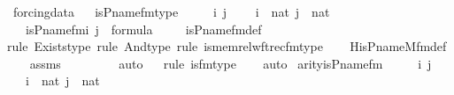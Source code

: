 \begin{isabellebody}
\isanewline
{}\isamarkupfalse%
\ forcing{\isacharunderscore}{\kern0pt}data\isanewline
{}\ \isanewline
\isanewline
{}\isamarkupfalse%
\ is{\isacharunderscore}{\kern0pt}P{\isacharunderscore}{\kern0pt}name{\isacharunderscore}{\kern0pt}fm{\isacharunderscore}{\kern0pt}type\ {\isacharcolon}{\kern0pt}\ \isanewline
\ \ \ i\ j\ \isanewline
\ \ \ {\isachardoublequoteopen}i\ {\isasymin}\ nat{\isachardoublequoteclose}\ {\isachardoublequoteopen}j\ {\isasymin}\ nat{\isachardoublequoteclose}\ \isanewline
\ \ \ {\isachardoublequoteopen}is{\isacharunderscore}{\kern0pt}P{\isacharunderscore}{\kern0pt}name{\isacharunderscore}{\kern0pt}fm{\isacharparenleft}{\kern0pt}i{\isacharcomma}{\kern0pt}\ j{\isacharparenright}{\kern0pt}\ {\isasymin}\ formula{\isachardoublequoteclose}\ \isanewline
%
\isadelimproof
\ \ %
\endisadelimproof
%
\isatagproof
{}\isamarkupfalse%
\ is{\isacharunderscore}{\kern0pt}P{\isacharunderscore}{\kern0pt}name{\isacharunderscore}{\kern0pt}fm{\isacharunderscore}{\kern0pt}def\ \isanewline
\ \ \isamarkupfalse%
{\isacharparenleft}{\kern0pt}rule\ Exists{\isacharunderscore}{\kern0pt}type{\isacharcomma}{\kern0pt}\ rule\ And{\isacharunderscore}{\kern0pt}type{\isacharcomma}{\kern0pt}\ rule\ is{\isacharunderscore}{\kern0pt}memrel{\isacharunderscore}{\kern0pt}wftrec{\isacharunderscore}{\kern0pt}fm{\isacharunderscore}{\kern0pt}type{\isacharparenright}{\kern0pt}\isanewline
\ \ \isamarkupfalse%
\ His{\isacharunderscore}{\kern0pt}P{\isacharunderscore}{\kern0pt}name{\isacharunderscore}{\kern0pt}M{\isacharunderscore}{\kern0pt}fm{\isacharunderscore}{\kern0pt}def\ \isanewline
\ \ \isamarkupfalse%
\ assms\ \isanewline
\ \ \ \ \ \ \isamarkupfalse%
\ auto{\isacharbrackleft}{\kern0pt}{}{\isacharbrackright}{\kern0pt}\isanewline
\ \ \isamarkupfalse%
{\isacharparenleft}{\kern0pt}rule\ is{\isacharunderscore}{\kern0pt}{}{\isacharunderscore}{\kern0pt}fm{\isacharunderscore}{\kern0pt}type{\isacharparenright}{\kern0pt}\isanewline
\ \ \isamarkupfalse%
\ auto%
\endisatagproof
{\isafoldproof}%
%
\isadelimproof
\isanewline
%
\endisadelimproof
\isanewline
{}\isamarkupfalse%
\ arity{\isacharunderscore}{\kern0pt}is{\isacharunderscore}{\kern0pt}P{\isacharunderscore}{\kern0pt}name{\isacharunderscore}{\kern0pt}fm\ {\isacharcolon}{\kern0pt}\ \isanewline
\ \ \ i\ j\ \isanewline
\ \ \ {\isachardoublequoteopen}i\ {\isasymin}\ nat{\isachardoublequoteclose}\ {\isachardoublequoteopen}j\ {\isasymin}\ nat{\isachardoublequoteclose}\ \isanewline

\end{isabellebody}

